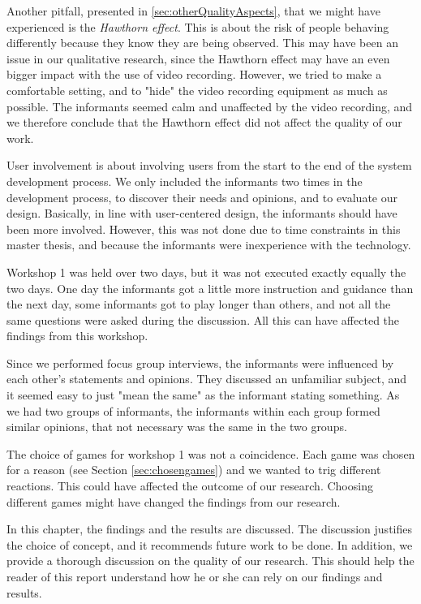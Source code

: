 Another pitfall, presented in \ref{sec:otherQualityAspects}, that we might have experienced is the \emph{Hawthorn effect}. This is about the risk of people behaving differently because they know they are being observed. This may have been an issue in our qualitative research, since the Hawthorn effect may have an even bigger impact with the use of video recording. However, we tried to make a comfortable setting, and to "hide" the video recording equipment as much as possible. The informants seemed calm and unaffected by the video recording, and we therefore conclude that the Hawthorn effect did not affect the quality of our work. 

User involvement is about involving users from the start to the end of the system development process. We only included the informants two times in the development process, to discover their needs and opinions, and to evaluate our design. Basically, in line with user-centered design, the informants should have been more involved. However, this was not done due to time constraints in this master thesis, and because the informants were inexperience with the technology. 

Workshop 1 was held over two days, but it was not executed exactly equally the two days. One day the informants got a little more instruction and guidance than the next day, some informants got to play longer than others, and not all the same questions were asked during the discussion. All this can have affected the findings from this workshop.  

Since we performed focus group interviews, the informants were influenced by each other's statements and opinions. They discussed an unfamiliar subject, and it seemed easy to just "mean the same" as the informant stating something. As we had two groups of informants, the informants within each group formed similar opinions, that not necessary was the same in the two groups.
   
The choice of games for workshop 1 was not a coincidence. Each game was chosen for a reason (see Section \ref{sec:chosengames}) and we wanted to trig different reactions. This could have affected the outcome of our research. Choosing different games might have changed the findings from our research. 

In this chapter, the findings and the results are discussed. The discussion justifies the choice of concept, and it recommends future work to be done. In addition, we provide a thorough discussion on the quality of our research. This should help the reader of this report understand how he or she can rely on our findings and results.


